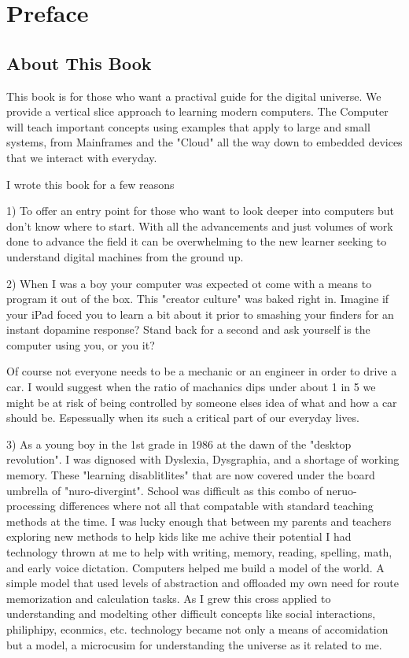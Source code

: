 \chapter{Preface}
\section{About This Book}

This book is for those who want a practival guide for the digital universe. We provide a vertical slice approach to learning modern computers. The Computer will teach important concepts using examples that apply to large and small systems, from Mainframes and the "Cloud" all the way down to embedded devices that we interact with everyday.

I wrote this book for a few reasons

1) To offer an entry point for those who want to  look deeper into computers but don't know where to start. With all the advancements and just volumes of work done to advance the field it can be overwhelming to the new learner seeking to understand digital machines from the ground up.

2) When I was a boy your computer was expected ot come with a means to program it out of the box. This "creator culture" was baked right in. Imagine if your iPad foced you to learn a bit about it prior to smashing your finders for an instant dopamine response? Stand back for a second and ask yourself is the computer using you, or you it?

Of course not everyone needs to be a mechanic or an engineer in order to drive a car. I would suggest when the ratio of machanics dips under about 1 in 5 we might be at risk of being controlled by someone elses idea of what and how a car should be. Espessually when its such a critical part of our everyday lives.

3) As a young boy in the 1st grade in 1986 at the dawn of the "desktop revolution". I was dignosed with Dyslexia, Dysgraphia, and a shortage of working memory. These "learning disablitlites" that are now covered under the board umbrella of "nuro-divergint". School was difficult as this combo of neruo-processing differences where not all that compatable with standard teaching methods at the time. I was lucky enough that between my parents and teachers exploring new methods to help kids like me achive their potential I had technology thrown at me to help with writing, memory, reading, spelling, math, and early voice dictation. Computers helped me build a model of the world. A simple model that used levels of abstraction and offloaded my own need for route memorization and calculation tasks. As I grew this cross applied to understanding and modelting other difficult concepts like social interactions, philiphipy, econmics, etc. technology became not only a means of accomidation but a model, a microcusim for understanding the universe as it related to me.

